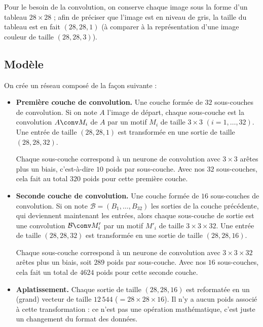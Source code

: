 \documentclass[11pt,class=report,crop=false]{standalone}
\begin{document}
Pour le besoin de la convolution, on conserve chaque image sous la forme d'un tableau $28\times 28$ ; afin de préciser que l'image est en niveau de gris, la taille du tableau \numpy{} est en fait $(28, 28, 1)$ (à comparer à la représentation d'une image couleur de taille $(28, 28, 3)$).

\subsection{Modèle}

On crée un réseau composé de la façon suivante :
\begin{itemize}
  \item \textbf{Première couche de convolution.} 
  Une couche formée de $32$ sous-couches de convolution. Si on note $A$ l'image de départ, chaque sous-couche est la convolution $A \conv M_i$ de $A$ par un motif $M_i$ de taille $3 \times 3$ $(i=1,\ldots,32)$. Une entrée de taille $(28,28,1)$ est transformée en une sortie de taille $(28,28,32)$.
   
  Chaque sous-couche correspond à un neurone de convolution avec $3 \times 3$ arêtes plus un biais, c'est-à-dire $10$ poids par sous-couche. Avec nos $32$ sous-couches, cela fait au total $320$ poids pour cette première couche. 
  
  
  
  \item \textbf{Seconde couche de convolution.}
  Une couche formée de $16$ sous-couches de convolution. Si on note $\mathcal{B} = (B_1,\ldots,B_{32})$ les sorties de la couche précédente, qui deviennent maintenant les entrées, alors chaque sous-couche de sortie est une convolution $\mathcal{B} \conv M'_i$ par un motif $M'_i$ de taille $3 \times 3 \times 32$. Une entrée de taille $(28,28,32)$ est transformée en une sortie de taille $(28,28,16)$.
  
  Chaque sous-couche correspond à un neurone de convolution avec $3 \times 3 \times 32$ arêtes plus un biais, soit $289$ poids par sous-couche. Avec nos $16$ sous-couches, cela fait un total de $4 624$ poids pour cette seconde couche.
  
  
  \item \textbf{Aplatissement.}
  Chaque sortie de taille  $(28,28,16)$ est reformatée en un (grand) vecteur de taille $12\,544$ ($= 28 \times 28 \times 16$). Il n'y a aucun poids associé à cette transformation : ce n'est pas une opération mathématique, c'est juste un changement du format des données.
  

\end{itemize}
\end{document}

